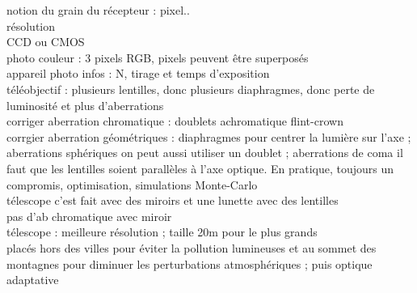 \begin{remarques}
	notion du grain du récepteur : pixel.. \\
	résolution \\
	CCD ou CMOS \\
	photo couleur : 3 pixels RGB, pixels peuvent être superposés  \\
	appareil photo infos : N, tirage et temps d'exposition \\
	téléobjectif : plusieurs lentilles, donc plusieurs diaphragmes, donc perte de luminosité et plus d'aberrations \\
	corriger aberration chromatique : doublets achromatique flint-crown \\
	corrgier aberration géométriques : diaphragmes pour centrer la lumière sur l’axe ; aberrations sphériques on peut aussi utiliser un doublet ; aberrations de coma il faut que les lentilles soient parallèles à l'axe optique. En pratique, toujours un compromis, optimisation, simulations Monte-Carlo \\
	télescope c'est fait avec des miroirs et une lunette avec des lentilles \\
	pas d'ab chromatique avec miroir \\
	télescope : meilleure résolution ; taille 20m pour le plus grands \\
	placés hors des villes pour éviter la pollution lumineuses et au sommet des montagnes pour diminuer les perturbations atmosphériques ; puis optique adaptative \\
\end{remarques}
